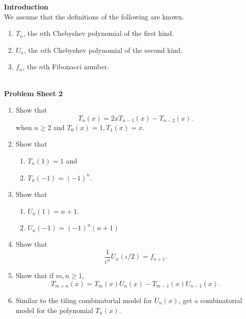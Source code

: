 \documentclass{article}
\begin{document}
\thispagestyle{empty}



% 
% 
% 

\textbf{\Large Introduction}\\

We assume that the definitions of the following are known.

\begin{enumerate}
	\item $T_n$, the $n$th Chebyshev polynomial of the first kind.
	\item $U_n$, the $n$th Chebyshev polynomial of the second kind.
	\item $f_{n}$, the $n$th Fibonacci number.
\end{enumerate}
\phantom{pain}\\

\textbf{\Large Problem Sheet 2}

\begin{enumerate}
	\item Show that
	\[ T_n(x) = 2xT_{n-1}(x) - T_{n-2}(x). \]
	when $n \ge 2$ and $T_0(x) = 1, T_1(x) = x$.

	\item Show that
	\begin{enumerate}[label=(\alph*)]
		\item $T_n(1) = 1$ and
		\item $T_n(-1) = (-1)^n$.
	\end{enumerate}
		
	\item Show that
	\begin{enumerate}[label=(\alph*)]
		\item $U_n(1) = n+1$.
		\item $U_n(-1) = (-1)^n(n+1)$
	\end{enumerate}

	\item Show that
	\[ \frac{1}{\iota^n} U_n(\iota/2) = f_{n+1}. \]

	\item Show that if $m,n \ge 1$,
	\[ T_{m+n}(x) = T_m(x)U_n(x) - T_{m-1}(x)U_{n-1}(x). \]

	\item Similar to the tiling combinatorial model for $U_n(x)$, get a combinatorial model for the polynomial $T_n(x)$.
\end{enumerate}

% 
% 
\end{document}
